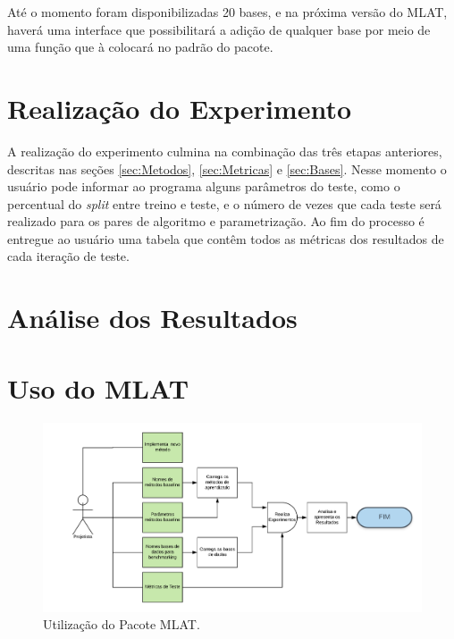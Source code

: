 Até o momento foram disponibilizadas 20 bases, e na próxima versão do MLAT, haverá uma interface que possibilitará a adição de qualquer base por meio de uma função que à colocará no padrão do pacote.

\section{Realização do Experimento}
A realização do experimento culmina na combinação das três etapas anteriores, descritas nas seções \ref{sec:Metodos}, \ref{sec:Metricas} e \ref{sec:Bases}. Nesse momento o usuário pode informar ao programa alguns parâmetros do teste, como o percentual do \textit{split} entre treino e teste, e o número de vezes que cada teste será realizado para os pares de algoritmo e parametrização. Ao fim do processo é entregue ao usuário uma tabela que contêm todos as métricas dos resultados de cada iteração de teste.

\section{Análise dos  Resultados}

\section{Uso do MLAT}

\begin{figure}[!htb]
	\centering
	\includegraphics[width=\textwidth]{./04-figuras/UseCase.png}
	\caption{Utilização do Pacote MLAT.} 
	\label{fig:BuildingMLModel}
\end{figure}


